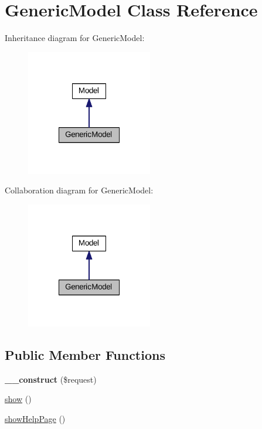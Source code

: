 \hypertarget{classGenericModel}{\section{Generic\+Model Class Reference}
\label{classGenericModel}
}


Inheritance diagram for Generic\+Model\+:\nopagebreak
\begin{figure}[H]
\begin{center}
\leavevmode
\includegraphics[width=156pt]{classGenericModel__inherit__graph}
\end{center}
\end{figure}


Collaboration diagram for Generic\+Model\+:\nopagebreak
\begin{figure}[H]
\begin{center}
\leavevmode
\includegraphics[width=156pt]{classGenericModel__coll__graph}
\end{center}
\end{figure}
\subsection*{Public Member Functions}
\begin{DoxyCompactItemize}
\item 
\hypertarget{classGenericModel_acd2ddd6efe0003c9fe876517307bf7d4}{{\bfseries \+\_\+\+\_\+construct} (\$request)}\label{classGenericModel_acd2ddd6efe0003c9fe876517307bf7d4}

\item 
\hyperlink{classGenericModel_a1fea07f39a9346955dff26476dac4650}{show} ()
\item 
\hyperlink{classGenericModel_acd7009f2fcaca1b046b371fe23e0fd2c}{show\+Help\+Page} ()
\end{DoxyCompactItemize}
